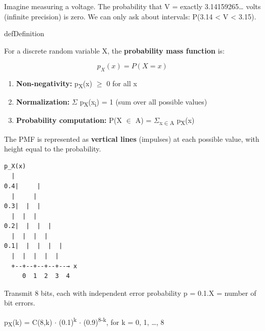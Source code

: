 
Imagine measuring a voltage. The probability that V = exactly 3.14159265… volts (infinite precision) is zero. We can only ask about intervals: P(3.14 \textless{} V \textless{} 3.15).


\begin{PSbox}[unbreakable]{def}{Definition}

For a discrete random variable X, the \textbf{probability mass function} is:

\[p_X(x) = P(X = x)\]

\end{PSbox}


\begin{enumerate}
\def\labelenumi{\arabic{enumi}.}
\tightlist
\item
  \textbf{Non-negativity:} p\textsubscript{X}(x) \ensuremath{\ge} 0 for all x
\item
  \textbf{Normalization:} \ensuremath{\Sigma} p\textsubscript{X}(x\textsubscript{i}) = 1 (sum over all possible values)
\item
  \textbf{Probability computation:} P(X \ensuremath{\in} A) = \ensuremath{\Sigma}\textsubscript{x\ensuremath{\in}A} p\textsubscript{X}(x)
\end{enumerate}


The PMF is represented as \textbf{vertical lines} (impulses) at each possible value, with height equal to the probability.


\begin{PSplaincode}
\begin{Verbatim}
p_X(x)
  |
0.4|     |
  |     |
0.3|  |  |
  |  |  |
0.2|  |  |  |
  |  |  |  |
0.1|  |  |  |  |
  |  |  |  |  |
  +--+--+--+--+--→ x
     0  1  2  3  4
\end{Verbatim}
\end{PSplaincode}


Transmit 8 bits, each with independent error probability p = 0.1.\PSbr{}X = number of bit errors.

p\textsubscript{X}(k) = C(8,k) \ensuremath{\cdot} (0.1)\textsuperscript{k} \ensuremath{\cdot} (0.9)\textsuperscript{8-k}, for k = 0, 1, …, 8

